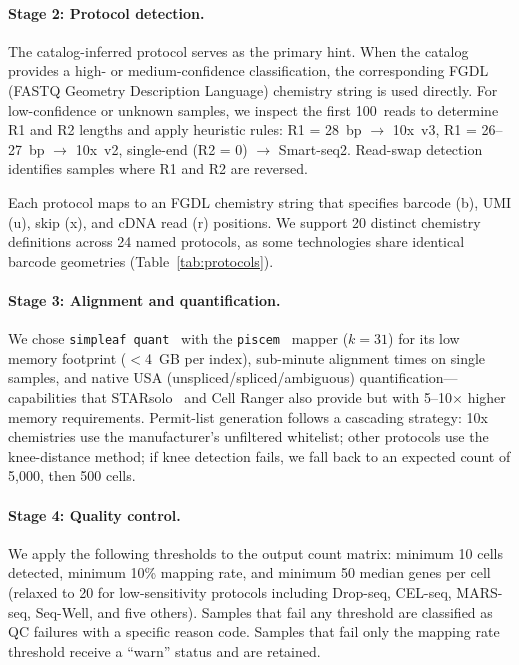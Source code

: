 \documentclass[10pt,twocolumn,letterpaper]{article}
\begin{document}
\paragraph{Stage 2: Protocol detection.} The catalog-inferred protocol
serves as the primary hint. When the catalog provides a high- or
medium-confidence classification, the corresponding FGDL (FASTQ Geometry
Description Language) chemistry string is used directly. For low-confidence
or unknown samples, we inspect the first 100~reads to determine R1 and R2
lengths and apply heuristic rules: R1 = 28~bp $\to$ 10x~v3,
R1 = 26--27~bp $\to$ 10x~v2, single-end (R2 = 0) $\to$ Smart-seq2. Read-swap
detection identifies samples where R1 and R2 are reversed.

Each protocol maps to an FGDL chemistry string that specifies barcode (b),
UMI (u), skip (x), and cDNA read (r) positions. We support 20 distinct
chemistry definitions across 24 named protocols, as some technologies share
identical barcode geometries (Table~\ref{tab:protocols}).

\paragraph{Stage 3: Alignment and quantification.} We chose
\texttt{simpleaf quant}~\citep{he2022} with the
\texttt{piscem}~\citep{patro2023} mapper ($k = 31$) for its low memory
footprint ($<$4~GB per index), sub-minute alignment times on single samples,
and native USA (unspliced/spliced/ambiguous) quantification—capabilities
that STARsolo~\citep{kaminow2021starsolo} and Cell Ranger also provide but
with 5--10$\times$ higher memory requirements.
Permit-list generation follows a cascading
strategy: 10x chemistries use the manufacturer's unfiltered whitelist; other
protocols use the knee-distance method; if knee detection fails, we fall
back to an expected count of 5,000, then 500 cells.

\paragraph{Stage 4: Quality control.} We apply the following thresholds to
the output count matrix: minimum 10 cells detected, minimum 10\% mapping
rate, and minimum 50 median genes per cell (relaxed to 20 for low-sensitivity
protocols including Drop-seq, CEL-seq, MARS-seq, Seq-Well, and five others).
Samples that fail any threshold are classified as QC failures with a
specific reason code. Samples that fail only the mapping rate threshold
receive a ``warn'' status and are retained.
\end{document}
